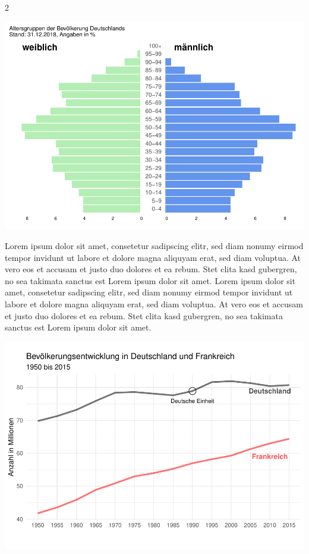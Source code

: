 \documentclass[
  a4paper,
  twoside]{article}
\begin{document}
\begin {multicols}{2}
\columnbreak

\includegraphics[width=1\linewidth]{2021-03-02_Beispiel_files/figure-latex/plot Pyramide 2-spaltig-1}

Lorem ipsum dolor sit amet, consetetur sadipscing elitr, sed diam nonumy
eirmod tempor invidunt ut labore et dolore magna aliquyam erat, sed diam
voluptua. At vero eos et accusam et justo duo dolores et ea rebum. Stet
clita kasd gubergren, no sea takimata sanctus est Lorem ipsum dolor sit
amet. Lorem ipsum dolor sit amet, consetetur sadipscing elitr, sed diam
nonumy eirmod tempor invidunt ut labore et dolore magna aliquyam erat,
sed diam voluptua. At vero eos et accusam et justo duo dolores et ea
rebum. Stet clita kasd gubergren, no sea takimata sanctus est Lorem
ipsum dolor sit amet.

\includegraphics[width=1\linewidth]{2021-03-02_Beispiel_files/figure-latex/unnamed-chunk-4-1}

\end {multicols}
\end{document}
